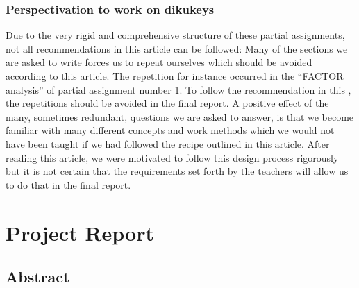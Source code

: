 \documentclass[11pt,a4paper]{report}
\begin{document}
\subsection{Perspectivation to work on dikukeys}
Due to the very rigid and comprehensive structure of these partial assignments, not all recommendations in this article can be followed: Many of the sections we are asked to write forces us to repeat ourselves which should be avoided according to this article. The repetition for instance occurred in the ``FACTOR analysis'' of partial assignment number 1. To follow the recommendation in this , the repetitions should be avoided in the final report. A positive effect of the many, sometimes redundant, questions we are asked to answer, is that we become familiar with many different concepts and work methods which we would not have been taught if we had followed the recipe outlined in this article. After reading this article, we were motivated to follow this design process rigorously but it is not certain that the requirements set forth by the teachers will allow us to do that in the final report.


\chapter{Project Report}\label{ch:Project_Report}

\section{Abstract}\label{sec:Abstract}
\end{document}
